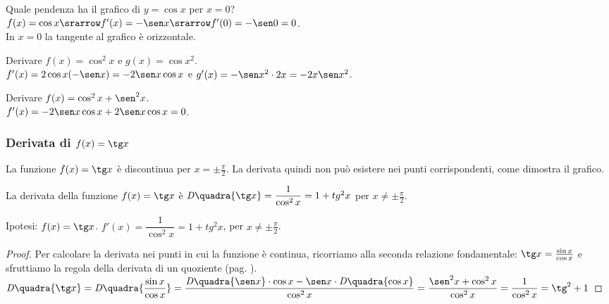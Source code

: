 \begin{esempio}
Quale pendenza ha il grafico di $y=\cos x$ per $x=0$?\\
$f(x)= \cos x \srarrow f'(x)=-\sen x\srarrow f'(0)=-\sen 0=0$.\\
In $x=0$ la tangente al grafico è orizzontale.
\end{esempio} 

\begin{esempio}
Derivare $f(x)=\cos^2 x$ e $g(x)= \cos x^2$.\\
$f'(x)=2\cos x(-\sen x)=-2\sen x\cos x$ e $g'(x)=-\sen x^2\cdot 2x=-2x\sen 
x^2$.
\end{esempio}

\begin{esempio}
Derivare $f(x)=\cos^2 x +\sen^2 x$.\\
$f'(x)=-2\sen x\cos x + 2\sen x \cos x = 0$.
\end{esempio}


\subsubsection{Derivata di $f(x)=\tg x$}
La funzione $f(x)=\tg x$ è discontinua per $x= \pm\frac{\pi}{2}$. La 
derivata quindi non può esistere nei punti corrispondenti, come dimostra il 
grafico.

\begin{inaccessibleblock}
  \begin{minipage}[]{.47\textwidth}
    \begin{center} \tangente \end{center}
 \end{minipage} 
  \hfill
 \begin{minipage}[]{.47\textwidth}
 \begin{center} \tangentitangente \end{center}
 \end{minipage}
\end{inaccessibleblock}
\label{}

\begin{teorema}
   La derivata della funzione $f(x)=\tg x$ è $\mathit{D}\quadra{\tg x}=
   \dfrac{1}{\cos^2 x}=1+tg^2 x$ per $x\ne \pm\frac{\pi}{2}$.
\end{teorema}
\noindent Ipotesi: $f(x)=\tg x$. \tab $f'(x)=\dfrac{1}{\cos^2 x}=1+tg^2 x$,
per $x\ne\pm\frac{\pi}{2}$.
\begin{proof}
Per calcolare la derivata nei punti in cui la funzione è continua, 
ricorriamo alla seconda relazione fondamentale: $\tg x=\frac{\sin x}{\cos x}$ e
sfruttiamo la regola della derivata di un quoziente (pag. 
\pageref{sec:diff01_regolederivate}).\\
$\mathit{D}\quadra{\tg x}=\mathit{D}\quadra{\dfrac{\sin x}{\cos x}}=
\dfrac{\mathit{D}\quadra{\sen x}\cdot \cos x-\sen x\cdot 
  \mathit{D}\quadra{\cos x}} {\cos^2 x}=
\dfrac{\sen^2 x +\cos^2 x}{\cos^2 x}=\dfrac{1}{\cos^2 x}=\tg^2+1$
\end{proof}

